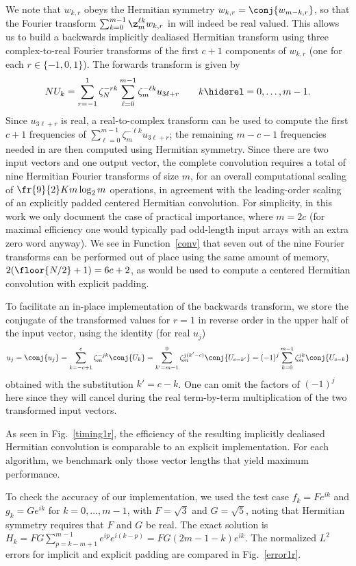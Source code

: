 \documentclass[final]{siamltex}
\def\bel{\begin{dmath}}
\def\eel{\end{dmath}}
\def\no{\hiderel}
\begin{document}
We note that $w_{k,r}$ obeys the Hermitian symmetry 
$w_{k,r}=\conj{w_{m-k,r}}$, so that the Fourier transform
$\sum_{k=0}^{m-1}\z_m^{\ell k} w_{k,r}$ in  will indeed
be real valued. This allows us to build a backwards implicitly dealiased
Hermitian transform using three complex-to-real Fourier transforms of the
first $c+1$ components of $w_{k,r}$ (one for each $r\in\{-1,0,1\}$). The
forwards transform is given by
\bel
NU_k
=\sum_{r=-1}^{1}\zeta_N^{-rk}\sum_{\ell=0}^{m-1}\zeta_m^{-\ell k} u_{3\ell+r}
\qquad k\no =0,\ldots,m-1.\label{fft0forwardsB}
\eel
Since $u_{3\ell+r}$ is real, a real-to-complex transform can be used to
compute the first $c+1$ frequencies of
$\sum_{\ell=0}^{m-1}\zeta_m^{-\ell k} u_{3\ell+r}$; the remaining $m-c-1$
frequencies needed in  are then computed using Hermitian
symmetry. Since there are two input vectors and
one output vector, the complete convolution requires a total of nine
Hermitian Fourier transforms of size $m$, for an overall computational
scaling of $\fr{9}{2}K m \log_2 m$ operations, in agreement with the
leading-order scaling of an explicitly padded centered Hermitian convolution.
For simplicity, in this work we only document the case of practical
importance, where $m=2c$ (for maximal efficiency one would typically pad
odd-length input arrays with an extra zero word anyway). We see in
Function~\ref{conv} that seven out of the nine Fourier transforms can be
performed out of place using the same amount of memory,
$2(\floor{N/2}+1)=6c+2$, as would be used to compute a centered Hermitian
convolution with explicit padding. 

To facilitate an in-place implementation of the
backwards transform, we store the conjugate of the transformed values for
$r=1$ in reverse order in the upper half of the input vector,
using the identity (for real $u_j$)
$$
u_j=\conj{u_j}=\sum_{k=-c+1}^{c}\zeta_m^{-jk} \conj{U_k}
=\sum_{k'=m-1}^{0}\zeta_m^{j(k'-c)} \conj{U_{c-k'}}
=(-1)^j\sum_{k=0}^{m-1}\zeta_m^{jk} \conj{U_{c-k}}
$$
obtained with the substitution $k'=c-k$. One can omit the factors of
$(-1)^j$ here since they will cancel during the real term-by-term multiplication
of the two transformed input vectors.

As seen in Fig.~\ref{timing1r}, the efficiency of the resulting implicitly
dealiased Hermitian convolution is comparable to an explicit implementation.
For each algorithm, we benchmark only those vector lengths that yield
maximum performance.

To check the accuracy of our implementation, we used the test case
$f_k=F e^{ik}$ and $g_k=G e^{ik}$ for $k=0,\ldots,m-1$,
with $F=\sqrt 3$ and $G=\sqrt 5$, noting that Hermitian symmetry
requires that $F$ and $G$ be real. The exact solution is 
$H_k=FG\sum_{p=k-m+1}^{m-1} e^{ip}e^{i(k-p)}=FG(2m-1-k)e^{ik}$.
The normalized $L^2$ errors for implicit and explicit padding are compared
in Fig.~\ref{error1r}.
\end{document}
